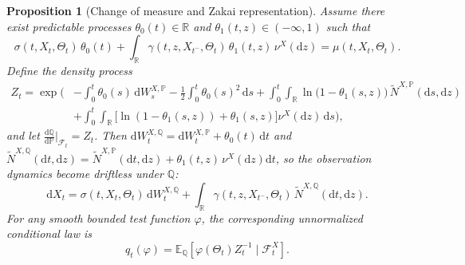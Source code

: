 \documentclass{article}
\newcommand{\E}{\mathbb{E}}
\newcommand{\R}{\mathbb{R}}
\newcommand{\dd}{\mathrm{d}}
\newtheorem{proposition}[theorem]{Proposition}
\begin{document}
\begin{proposition}[Change of measure and Zakai representation]
\label{prop:zakai-representation}
Assume there exist predictable processes $\theta_0(t)\in\R$ and $\theta_1(t,z)\in(-\infty,1)$ such that
\begin{equation*}
\sigma(t,X_t,\Theta_t)\,\theta_0(t)
+
\int_{\R}\gamma(t,z,X_{t^-},\Theta_t)\,\theta_1(t,z)\,\nu^X(\dd z)
=
\mu(t,X_t,\Theta_t).
\end{equation*}
Define the density process
\begin{equation*}
\begin{aligned}
Z_t
=
\exp\Bigg(
&-\int_0^t \theta_0(s)\,\dd W_s^{X,\mathbb P}
- \frac12\int_0^t \theta_0(s)^2\,\dd s +\int_0^t\int_{\R}\ln\!\bigl(1-\theta_1(s,z)\bigr)\,\widetilde N^{X,\mathbb P}(\dd s,\dd z) \\
&+\int_0^t\int_{\R}\bigl[\ln(1-\theta_1(s,z))+\theta_1(s,z)\bigr]\nu^X(\dd z)\,\dd s
\Bigg),
\end{aligned}
\end{equation*}
and let $\frac{\dd \mathbb Q}{\dd \mathbb P}\big|_{\mathcal F_t}=Z_t$. Then
$
\dd W_t^{X,\mathbb Q}
=
\dd W_t^{X,\mathbb P}+\theta_0(t)\,\dd t$ and $
\widetilde N^{X,\mathbb Q}(\dd t,\dd z)
=
\widetilde N^{X,\mathbb P}(\dd t,\dd z)+\theta_1(t,z)\,\nu^X(\dd z)\dd t$, 
so the observation dynamics become driftless under $\mathbb Q$:
\begin{equation*}
\dd X_t
=
\sigma(t,X_t,\Theta_t)\,\dd W_t^{X,\mathbb Q}
+
\int_{\R}\gamma(t,z,X_{t^-},\Theta_t)\,\widetilde N^{X,\mathbb Q}(\dd t,\dd z).
\end{equation*}
For any smooth bounded test function $\varphi$, the corresponding unnormalized conditional law is
\[
q_t(\varphi)
=
\E_{\mathbb Q}\!\left[
\varphi(\Theta_t) Z_t^{-1}\mid \mathcal F_t^X
\right].
\]
\end{proposition}
\end{document}
